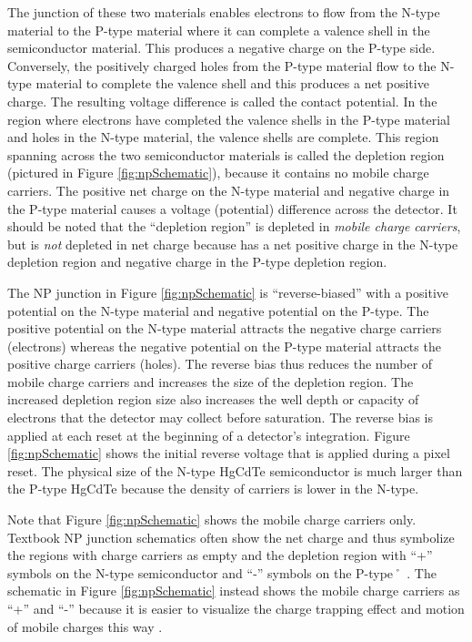 \documentclass{aastex62}
\begin{document}
The junction of these two materials enables electrons to flow from the N-type material to the P-type material where it can complete a valence shell in the semiconductor material.
This produces a negative charge on the P-type side.
Conversely, the positively charged holes from the P-type material flow to the N-type material to complete the valence shell and this produces a net positive charge.
The resulting voltage difference is called the contact potential.
In the region where electrons have completed the valence shells in the P-type material and holes in the N-type material, the valence shells are complete.
This region spanning across the two semiconductor materials is called the depletion region (pictured in Figure \ref{fig:npSchematic}), because it contains no mobile charge carriers.
The positive net charge on the N-type material and negative charge in the P-type material causes a voltage (potential) difference across the detector.
It should be noted that the ``depletion region'' is depleted in {\it mobile charge carriers}, but is {\it not} depleted in net charge because has a net positive charge in the N-type depletion region and negative charge in the P-type depletion region.

The NP junction in Figure \ref{fig:npSchematic} is ``reverse-biased'' with a positive potential on the N-type material and negative potential on the P-type.
The positive potential on the N-type material attracts the negative charge carriers (electrons) whereas the negative potential on the P-type material attracts the  positive charge carriers (holes).
The reverse bias thus reduces the number of mobile charge carriers and increases the size of the depletion region.
The increased depletion region size also increases the well depth or capacity of electrons that the detector may collect before saturation.
The reverse bias is applied at each reset at the beginning of a detector's integration.
Figure \ref{fig:npSchematic} shows the initial reverse voltage that is applied during a pixel reset. 
The physical size of the N-type HgCdTe semiconductor is much larger than the P-type HgCdTe because the density of carriers is lower in the N-type.

Note that Figure \ref{fig:npSchematic} shows the mobile charge carriers only.
Textbook NP junction schematics often show the net charge and thus symbolize the regions with charge carriers as empty and the depletion region with ``+'' symbols on the N-type semiconductor and ``-'' symbols on the P-type˚ \citep[e.g.][]{halliday2004physicsText}.
The schematic in Figure \ref{fig:npSchematic} instead shows the mobile charge carriers as ``+'' and ``-'' because it is easier to visualize the charge trapping effect and motion of mobile charges this way \citep[e.g.][]{smith2008imgPersistence}.
\end{document}
